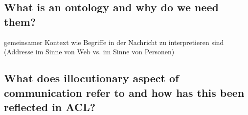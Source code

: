 \subsection{What is an ontology and why do we need them?}
gemeinsamer Kontext wie Begriffe in der Nachricht zu interpretieren sind (Addresse im Sinne von Web vs. im Sinne von Personen)
\subsection{What does illocutionary aspect of communication refer to and how has this been reflected in ACL?}
